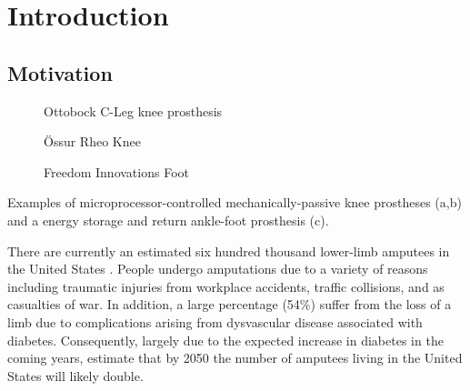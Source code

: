 \chapter{Introduction}\label{sec:intro}

\section{Motivation}\label{sec:intro_motivation}
\begin{marginfigure}[0.8in]
    \centering
	\begin{subfigure}[b]{\textwidth}
    	\centering
        \caption{Ottobock C-Leg knee prosthesis}
        \label{fig:ottobock_cleg}
        \vspace{0.25in}
	\end{subfigure}
	\begin{subfigure}[b]{\textwidth}
    	\centering
        \caption{Össur Rheo Knee}
        \label{fig:ossur_rheo}
        \vspace{0.25in}
	\end{subfigure}
	\begin{subfigure}[b]{\textwidth}
    	\centering
        \caption{Freedom Innovations Foot}
        \label{fig:freedom_innovations_foot}
	\end{subfigure}
    \caption{Examples of microprocessor-controlled mechanically-passive knee
    prostheses (a,b) and a energy storage and return ankle-foot prosthesis (c).}
\end{marginfigure}
There are currently an estimated six hundred thousand lower-limb amputees in the
United States \citep{ziegler2008estimating}. People undergo amputations due to a
variety of reasons including traumatic injuries from workplace accidents,
traffic collisions, and as casualties of war. In addition, a large percentage
(54\%) suffer from the loss of a limb due to complications arising from
dysvascular disease associated with diabetes.  Consequently, largely due to the
expected increase in diabetes in the coming years,
\citet{ziegler2008estimating} estimate that by 2050 the number of amputees
living in the United States will likely double.

